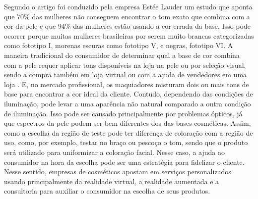 Segundo o artigo \cite{Snap_and_match_a_case_study_of_virtual_color_cosmetics_consultation} foi conduzido pela empresa Estée Lauder um estudo que aponta que 70\% das mulheres não conseguem encontrar o tom exato que combina com a cor da pele e que 94\% das mulheres estão usando a cor errada da base. Isso pode ocorrer porque muitas mulheres brasileiras por serem muito brancas categorizadas como fototipo I, morenas escuras como fototipo V, e  negras, fototipo VI\cite{Régua_de_Pele_Linha_de_Maquiagem_para_a_Mulher_Brasileira}.
A maneira tradicional do consumidor de determinar qual a base de cor combina com a pele requer aplicar tons disponíveis na loja na pele \cite{A_development_of_a_portable_device_for_skin_color_estimation_on_cosmetic_foundation_applying} ou por seleção visual, sendo a compra também em loja virtual ou com a ajuda de vendedores em uma loja \cite{Snap_and_match_a_case_study_of_virtual_color_cosmetics_consultation}.
E, no mercado profissional, os maquiadores misturam dois ou mais tons de base para encontrar a cor ideal da cliente. Contudo, dependendo das condições de iluminação, pode levar a uma aparência não natural comparado a outra condição de iluminação.  Isso pode ser causado principalmente por problemas ópticos, já que espectros da pele podem ser bem diferentes dos das bases cosméticas. Assim, como a escolha da região de teste pode ter diferença de coloração com a região de uso, como, por exemplo, testar no braço ou pescoço o tom, sendo que o produto será utilizado para uniformizar a coloração facial. Nesse caso, a ajuda ao consumidor na hora da escolha pode ser uma estratégia para fidelizar o cliente.
Nesse sentido, empresas de cosméticos apostam em serviços personalizados usando principalmente da realidade virtual, a realidade aumentada e a consultoria para auxiliar o consumidor na escolha de seus produtos.



